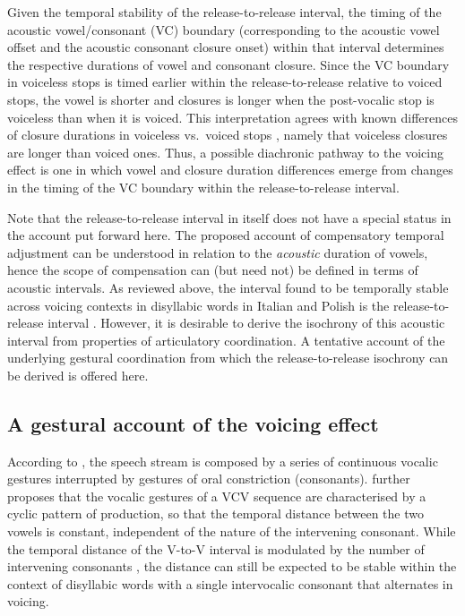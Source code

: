 \documentclass[12pt,a4paper,]{article}
\begin{document}
Given the temporal stability of the release-to-release interval, the
timing of the acoustic vowel/consonant (VC) boundary (corresponding to
the acoustic vowel offset and the acoustic consonant closure onset)
within that interval determines the respective durations of vowel and
consonant closure. Since the VC boundary in voiceless stops is timed
earlier within the release-to-release relative to voiced stops, the
vowel is shorter and closures is longer when the post-vocalic stop is
voiceless than when it is voiced. This interpretation agrees with known
differences of closure durations in voiceless vs.~voiced stops
\citep{lisker1957, van-summers1987, davis1989, de-jong1991}, namely that
voiceless closures are longer than voiced ones. Thus, a possible
diachronic pathway to the voicing effect is one in which vowel and
closure duration differences emerge from changes in the timing of the VC
boundary within the release-to-release interval.

Note that the release-to-release interval in itself does not have a
special status in the account put forward here. The proposed account of
compensatory temporal adjustment can be understood in relation to the
\textit{acoustic} duration of vowels, hence the scope of compensation
can (but need not) be defined in terms of acoustic intervals. As
reviewed above, the interval found to be temporally stable across
voicing contexts in disyllabic words in Italian and Polish is the
release-to-release interval \citep{coretta2019k}. However, it is
desirable to derive the isochrony of this acoustic interval from
properties of articulatory coordination. A tentative account of the
underlying gestural coordination from which the release-to-release
isochrony can be derived is offered here.

\hypertarget{a-gestural-account-of-the-voicing-effect}{%
\subsection{A gestural account of the voicing
effect}\label{a-gestural-account-of-the-voicing-effect}}

\label{s:gest}

According to \citet{ohman1966, ohman1967}, the speech stream is composed
by a series of continuous vocalic gestures interrupted by gestures of
oral constriction (consonants). \citet{fowler1983} further proposes that
the vocalic gestures of a VCV sequence are characterised by a cyclic
pattern of production, so that the temporal distance between the two
vowels is constant, independent of the nature of the intervening
consonant. While the temporal distance of the V-to-V interval is
modulated by the number of intervening consonants
\citep{zmarich2011, zeroual2015}, the distance can still be expected to
be stable within the context of disyllabic words with a single
intervocalic consonant that alternates in voicing.
\end{document}
